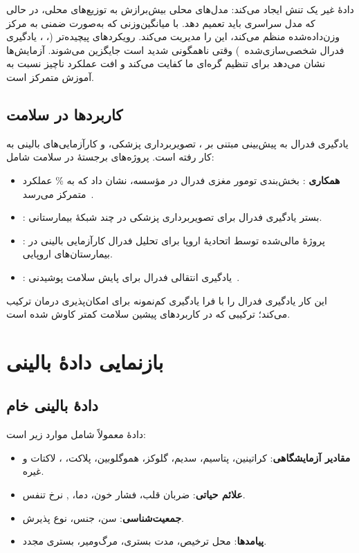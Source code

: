 دادۀ غیر  یک تنش ایجاد می‌کند: مدل‌های محلی بیش‌برازش به توزیع‌های محلی، در حالی که مدل سراسری باید تعمیم دهد.  با میانگین‌وزنی که به‌صورت ضمنی به مرکز وزن‌داده‌شده منظم می‌کند، این را مدیریت می‌کند. رویکردهای پیچیده‌تر (، ، یادگیری فدرال شخصی‌سازی‌شده~\cite{smith2017federated}) وقتی ناهمگونی شدید است جایگزین می‌شوند. آزمایش‌ها نشان می‌دهد برای تنظیم  گره‌ای ما  کفایت می‌کند و افت عملکرد ناچیز نسبت به آموزش متمرکز است.

\subsection{کاربردها در سلامت}

یادگیری فدرال به پیش‌بینی مبتنی بر ، تصویربرداری پزشکی، و کارآزمایی‌های بالینی به کار رفته است. پروژه‌های برجستۀ  در سلامت شامل:
\begin{itemize}
\item \textbf{همکاری }: بخش‌بندی تومور مغزی فدرال در  مؤسسه، نشان داد که  به \% عملکرد متمرکز می‌رسد~\cite{sheller2020federated}.
\item \textbf{}: بستر یادگیری فدرال برای تصویربرداری پزشکی در چند شبکۀ بیمارستانی.
\item \textbf{}: پروژۀ مالی‌شده توسط اتحادیۀ اروپا برای تحلیل فدرال کارآزمایی بالینی در بیمارستان‌های اروپایی.
\item \textbf{}: یادگیری انتقالی فدرال برای پایش سلامت پوشیدنی~\cite{chen2020fedhealth}.
\end{itemize}
این کار یادگیری فدرال را با فرا یادگیری کم‌نمونه برای امکان‌پذیری درمان ترکیب می‌کند؛ ترکیبی که در کاربردهای پیشین  سلامت کمتر کاوش شده است.

\section{بازنمایی دادۀ بالینی}

\subsection{دادۀ بالینی خام}

دادۀ  معمولاً شامل موارد زیر است:
\begin{itemize}
\item \textbf{مقادیر آزمایشگاهی}: کراتینین، پتاسیم، سدیم، گلوکز، هموگلوبین، پلاکت، ، لاکتات و غیره.
\item \textbf{علائم حیاتی}: ضربان قلب، فشار خون، دما، , نرخ تنفس.
\item \textbf{جمعیت‌شناسی}: سن، جنس، نوع پذیرش.
\item \textbf{پیامدها}: محل ترخیص، مدت بستری، مرگ‌ومیر، بستری مجدد.
\end{itemize}


